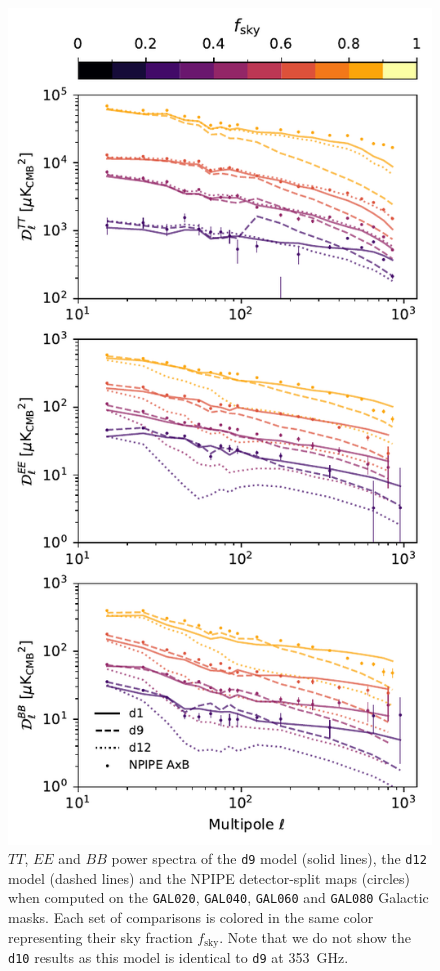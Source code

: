 \documentclass[twocolumn]{aastex631}
\begin{document}
\begin{figure}
    \centering
    \includegraphics[width=\columnwidth]{figures/largefield_power_all_TEB_pub.pdf}
    \caption{$TT$, $EE$ and $BB$ power spectra of the \texttt{d9} model (solid lines), the \texttt{d12} model (dashed lines) and the NPIPE detector-split maps (circles) when computed on the \texttt{GAL020}, \texttt{GAL040}, \texttt{GAL060} and \texttt{GAL080} Galactic masks. Each set of comparisons is colored in the same color representing their sky fraction $f_{\mathrm{sky}}$. Note that we do not show the \texttt{d10} results as this model is identical to \texttt{d9} at 353~GHz.}
    \label{fig:largefield_power}
\end{figure}
\end{document}
